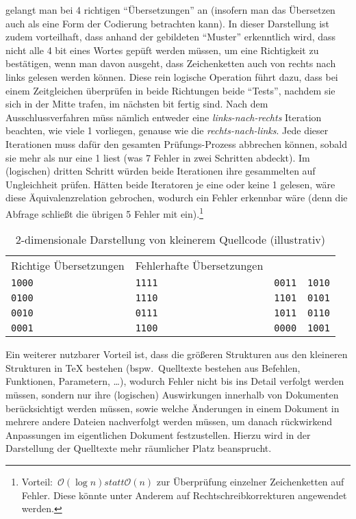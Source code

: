 gelangt man bei 4 richtigen \enquote{Übersetzungen} an (insofern man das Übersetzen auch als eine Form der Codierung betrachten kann).
In dieser Darstellung ist zudem vorteilhaft, dass anhand der gebildeten \enquote{Muster} erkenntlich wird, dass nicht alle 4 bit eines Wortes gepüft werden müssen, um eine Richtigkeit zu bestätigen, wenn man davon ausgeht, dass Zeichenketten auch von rechts nach links gelesen werden können. Diese rein logische Operation führt dazu, dass bei einem Zeitgleichen überprüfen in beide Richtungen beide \enquote{Tests}, nachdem sie sich in der Mitte trafen, im nächsten bit fertig sind. Nach dem Ausschlussverfahren müss nämlich entweder eine \textit{links-nach-rechts} Iteration beachten, wie viele 1 vorliegen, genause wie die \textit{rechts-nach-links}. Jede dieser Iterationen muss dafür den gesamten Prüfungs-Prozess abbrechen können, sobald sie mehr als nur eine 1 liest (was 7 Fehler in zwei Schritten abdeckt). Im (logischen) dritten Schritt würden beide Iterationen ihre gesammelten auf Ungleichheit prüfen. Hätten beide Iteratoren je eine oder keine 1 gelesen, wäre diese Äquivalenzrelation gebrochen, wodurch ein Fehler erkennbar wäre (denn die Abfrage schließt die übrigen 5 Fehler mit ein).\footnote{Vorteil:\ $\mathcal{O}(\log{n}) statt \mathcal{O}(n)$ zur Überprüfung einzelner Zeichenketten auf Fehler. Diese könnte unter Anderem auf Rechtschreibkorrekturen angewendet werden.}%
\begin{table}
    \centering
    \begin{tabularx}{\textwidth}{X|XXX}
        \toprule
        Richtige Übersetzungen & Fehlerhafte Übersetzungen & &\\
            \verb|1000| & \verb|1111| & \verb|0011| & \verb|1010|\\
            \verb|0100| & \verb|1110| & \verb|1101| & \verb|0101|\\
            \verb|0010| & \verb|0111| & \verb|1011| & \verb|0110|\\
            \verb|0001| & \verb|1100| & \verb|0000| & \verb|1001|\\
    \end{tabularx}
    \caption{2-dimensionale Darstellung von kleinerem Quellcode (illustrativ)}\label{tab:problems:exampleExample}
\end{table}



Ein weiterer nutzbarer Vorteil ist, dass die größeren Strukturen aus den kleineren Strukturen in \TeX{} bestehen (bspw.\ Quelltexte bestehen aus Befehlen, Funktionen, Parametern, \ldots), wodurch Fehler nicht bis ins Detail verfolgt werden müssen, sondern nur ihre (logischen) Auswirkungen innerhalb von Dokumenten berücksichtigt werden müssen, sowie welche Änderungen in einem Dokument in mehrere andere Dateien nachverfolgt werden müssen, um danach rückwirkend Anpassungen im eigentlichen Dokument festzustellen.%
Hierzu wird in der Darstellung der Quelltexte mehr räumlicher Platz beansprucht.

